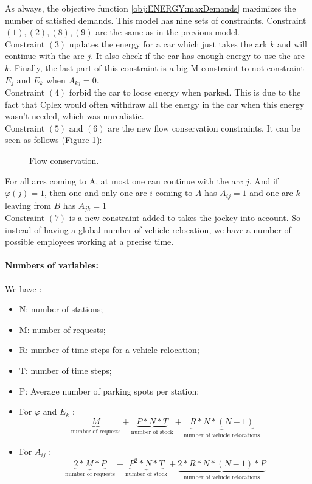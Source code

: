 \begin{bibunit}[ieeetr]
As always, the objective function \ref{obj:ENERGY:maxDemands} maximizes the number of satisfied demands.
This model has nine sets of constraints.
Constraint $(1),(2),(8),(9)$ are the same as in the previous model.\\
Constraint $(3)$ updates the energy for a car which just takes the ark $k$ and will continue with the arc $j$.
It also check if the car has enough energy to use the arc $k$.
Finally, the last part of this constraint is a big M constraint to not constraint $E_{j}$ and $E_{k}$ when $A_{kj} = 0$.\\
Constraint $(4)$ forbid the car to loose energy when parked.
This is due to the fact that Cplex would often withdraw all the energy in the car when this energy wasn't needed, which was unrealistic.\\
Constraint $(5)$ and $(6)$ are the new flow conservation constraints.
It can be seen as follows (Figure \ref{fig:flowConservation}):

\begin{figure}[t]
\begin{center}
\scalebox{1}{}
\end{center}
\caption{Flow conservation.}
\label{fig:flowConservation}
\end{figure}

For all arcs coming to A, at most one can continue with the arc $j$.
And if $\varphi (j)= 1$, then one and only one arc $i$ coming to $A$ has $A_{ij} = 1$ and one arc $k$ leaving from $B$ has $A_{jk} = 1$\\
Constraint $(7)$ is a new constraint added to takes the jockey into account.
So instead of having a global number of vehicle relocation, we have a number of possible employees working at a precise time.

\paragraph{Numbers of variables:}
We have : 
\begin{itemize}
\item N: number of stations;
\item M: number of requests;
\item R: number of time steps for a vehicle relocation;
\item T: number of time steps;
\item P: Average number of parking spots per station;
\item For $\varphi$ and  $E_{k}$ : $$\underbrace{M}_\textrm{number of requests} + \underbrace{P * N * T}_\textrm{number of stock} + \underbrace{R * N * (N -1)}_\textrm{number of vehicle relocations}$$
\item For $A_{ij}$ : $$\underbrace{2 * M * P }_\textrm{number of requests} + \underbrace{P^{2} * N * T}_\textrm{number of stock} + \underbrace{2* R * N * (N -1) * P}_\textrm{number of vehicle relocations}$$
\end{itemize}


\end{bibunit}

